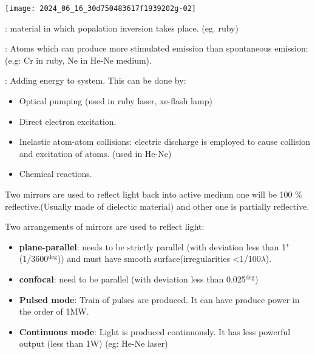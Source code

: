 \documentclass[12pt, a4paper]{article}
\begin{document}
\begin{center}
	\texttt{[image: 2024\_06\_16\_30d750483617f1939202g-02]}
\end{center}

: material in which popalation inversion takes place. (eg. ruby)

: Atoms which can produce more stimulated emission than spontaneous emission: (e.g: Cr in ruby, Ne in He-Ne medium).

: Adding energy to system. This can be done by:
\begin{itemize}
	\item Optical pumping (used in ruby laser, xe-flash lamp)
	\item Direct electron excitation.
	\item Inelastic atom-atom collisions: electric discharge is employed to cause collision and excitation of atoms. (used in He-Ne)
	\item Chemical reactions.

\end{itemize}


Two mirrors are used to reflect light back into active medium one will be 100 \% reflective.(Usually made of dielectic material) and other one is partially reflective.

Two arrangements of mirrors are used to reflect light:
\begin{itemize}
	\item \textbf{plane-parallel}: needs to be strictly parallel (with deviation less than 1" (1/3600$^{\deg}$)) and must have smooth surface(irregularities <1/100$\lambda$).
	\item \textbf{confocal}: need to be parallel (with deviation less than 0.025$^{\deg}$)
\end{itemize}



\begin{itemize}
	\item \textbf{Pulsed mode}: Train of pulses are produced. It can have produce power in the order of 1MW.
	\item \textbf{Continuous mode}: Light is produced continuously. It has less powerful output (less than 1W) (eg: He-Ne laser)
\end{itemize}
\end{document}
